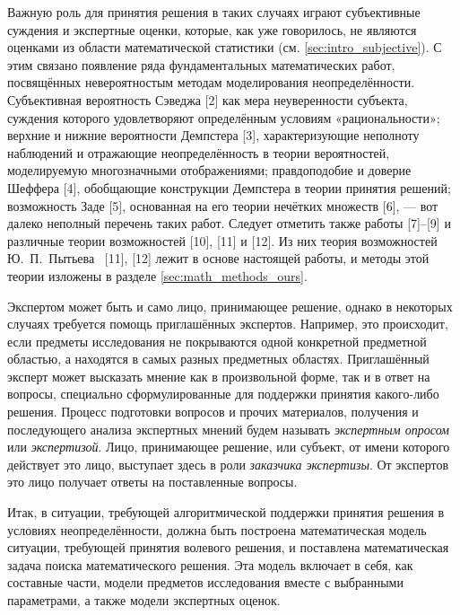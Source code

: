 Важную роль для принятия решения в таких случаях играют субъективные суждения и экспертные оценки, которые, как уже говорилось, не являются оценками из области математической статистики (см. \ref{sec:intro_subjective}). С этим связано появление ряда фундаментальных математических работ, посвящённых невероятностым методам моделирования неопределённости. Субъективная вероятность Сэведжа [2] как мера неуверенности субъекта, суждения которого удовлетворяют определённым условиям «рациональности»; верхние и нижние вероятности Демпстера [3], характеризующие неполноту наблюдений и отражающие неопределённость в теории вероятностей, моделируемую многозначными отображениями; правдоподобие и доверие Шеффера [4], обобщающие конструкции Демпстера в теории принятия решений; возможность Заде [5], основанная на его теории нечётких множеств [6], — вот далеко неполный перечень таких работ. Следует отметить также работы [7]–[9] и различные теории возможностей [10], [11] и [12]. Из них теория возможностей Ю.~П.~Пытьева~\cite{possbook} [11], [12] лежит в основе настоящей работы, и методы этой теории изложены в разделе \ref{sec:math_methods_ours}.  

Экспертом может быть и само лицо, принимающее решение, однако в некоторых случаях требуется помощь приглашённых экспертов. Например, это происходит, если предметы исследования не покрываются одной конкретной предметной областью, а находятся в самых разных предметных областях.  Приглашённый эксперт может высказать мнение как в произвольной форме, так и в ответ на вопросы, специально сформулированные для поддержки принятия какого-либо решения. Процесс подготовки вопросов и прочих материалов, получения и последующего анализа экспертных мнений будем называть {\sl экспертным опросом} или {\sl экспертизой}. Лицо, принимающее решение, или субъект, от имени которого действует это лицо, выступает здесь в роли {\sl заказчика экспертизы}. От экспертов это лицо получает ответы на поставленные вопросы.

Итак, в ситуации, требующей алгоритмической поддержки принятия решения в условиях неопределённости, должна быть построена математическая модель ситуации, требующей принятия волевого решения, и поставлена математическая задача поиска математического решения. Эта модель включает в себя, как составные части, модели предметов исследования вместе с выбранными параметрами, а также модели экспертных оценок.
 
